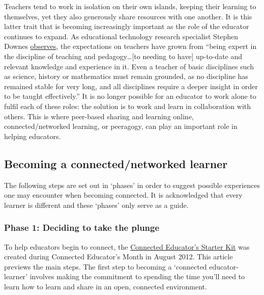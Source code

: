 Teachers tend to work in isolation on their own islands, keeping their
learning to themselves, yet they also generously share resources with
one another. It is this latter trait that is becoming increasingly
important as the role of the educator continues to expand. As
educational technology research specialist Stephen Downes
\href{http://www.huffingtonpost.com/stephen-downes/the-role-of-the-educator_b_790937.html}{observes},
the expectations on teachers have grown from ``being expert in the
discipline of teaching and pedagogy\ldots{}{{[}to needing to have{]}}
up-to-date and relevant knowledge and experience in it. Even a teacher
of basic disciplines such as science, history or mathematics must remain
grounded, as no discipline has remained stable for very long, and all
disciplines require a deeper insight in order to be taught
effectively.'' It is no longer possible for an educator to work alone to
fulfil each of these roles: the solution is to work and learn in
collaboration with others. This is where peer-based sharing and learning
online, connected/networked learning, or peeragogy, can play an
important role in helping educators.

\subsection{Becoming a connected/networked
learner}\label{becoming-a-connectednetworked-learner}

The following steps are set out in `phases' in order to suggest possible
experiences one may encounter when becoming connected. It is
acknowledged that every learner is different and these `phases' only
serve as a guide.

\subsubsection{Phase 1: Deciding to take the
plunge}\label{phase-1-deciding-to-take-the-plunge}

To help educators begin to connect, the
\href{http://www.google.com/url?q=https\%3A\%2F\%2Fdl.dropbox.com\%2Fu\%2F38904447\%2Fstarter-kit-final.pdf\&sa=D\&sntz=1\&usg=AFQjCNE9sNo1Lz9-zJ0KH48djXeYVoAF4A}{Connected
Educator's Starter Kit} was created during Connected Educator's Month in
August 2012. This article previews the main steps. The first step to
becoming a `connected educator-learner' involves making the commitment
to spending the time you'll need to learn how to learn and share in an
open, connected environment.

